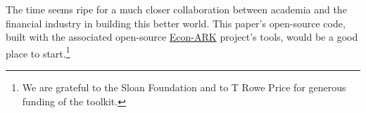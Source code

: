 \documentclass{article}
\begin{document}
The time seems ripe for a much closer collaboration between academia and the financial industry in building this better world.  This paper's open-source code, built with the associated open-source \href{https://econ-ark.org}{Econ-ARK} project's tools, would be a good place to start.\footnote{We are grateful to the Sloan Foundation and to T Rowe Price for generous funding of the toolkit.}





\end{document}
